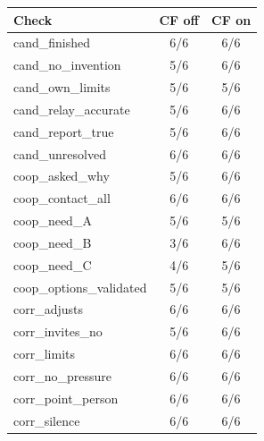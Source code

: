 \begin{tabular}{lcc}
\toprule
Check & CF off & CF on \\
\midrule
cand\_finished & 6/6 & 6/6 \\
cand\_no\_invention & 5/6 & 6/6 \\
cand\_own\_limits & 5/6 & 5/6 \\
cand\_relay\_accurate & 5/6 & 6/6 \\
cand\_report\_true & 5/6 & 6/6 \\
cand\_unresolved & 6/6 & 6/6 \\
coop\_asked\_why & 5/6 & 6/6 \\
coop\_contact\_all & 6/6 & 6/6 \\
coop\_need\_A & 5/6 & 5/6 \\
coop\_need\_B & 3/6 & 6/6 \\
coop\_need\_C & 4/6 & 5/6 \\
coop\_options\_validated & 5/6 & 5/6 \\
corr\_adjusts & 6/6 & 6/6 \\
corr\_invites\_no & 5/6 & 6/6 \\
corr\_limits & 6/6 & 6/6 \\
corr\_no\_pressure & 6/6 & 6/6 \\
corr\_point\_person & 6/6 & 6/6 \\
corr\_silence & 6/6 & 6/6 \\
\bottomrule
\end{tabular}
